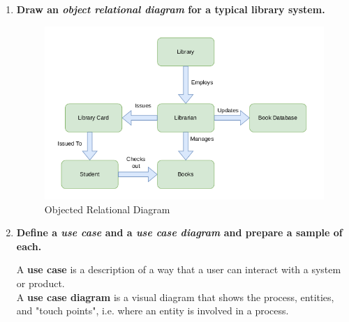 \documentclass{article}
\begin{document}
\begin{enumerate}
  \item \textbf{Draw an \textit{object relational diagram} for a typical library system.}
    \begin{figure}[H]
      \centering
      \includegraphics[width=0.8\linewidth]{../images/object_relational_diagram.png}
      \caption{Objected Relational Diagram}
    \end{figure}

  \item \textbf{Define a \textit{use case} and a \textit{use case diagram} and prepare a sample of each.}
    
    A \textbf{use case} is a description of a way that a user can interact with a system or product. \\
    A \textbf{use case diagram} is a visual diagram that shows the process, entities, and "touch points",
    i.e. where an entity is involved in a process.


\end{enumerate}
\end{document}
